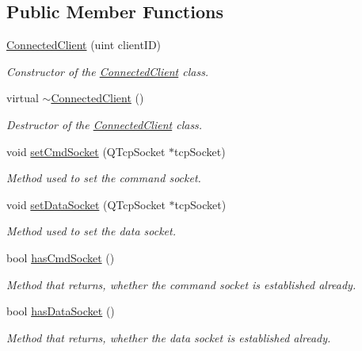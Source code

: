 \subsection*{Public Member Functions}
\begin{DoxyCompactItemize}
\item 
\hyperlink{class_network_1_1_connected_client_a9797ac03885fae449628ab2403515398}{Connected\+Client} (uint client\+I\+D)
\begin{DoxyCompactList}\small\item\em Constructor of the \hyperlink{class_network_1_1_connected_client}{Connected\+Client} class. \end{DoxyCompactList}\item 
virtual \hyperlink{class_network_1_1_connected_client_ad10880c9d465fba5f29dd9acfc8f374e}{$\sim$\+Connected\+Client} ()
\begin{DoxyCompactList}\small\item\em Destructor of the \hyperlink{class_network_1_1_connected_client}{Connected\+Client} class. \end{DoxyCompactList}\item 
void \hyperlink{class_network_1_1_connected_client_a84d4ba47b0b82bb01fa6faca9e793412}{set\+Cmd\+Socket} (Q\+Tcp\+Socket $\ast$tcp\+Socket)
\begin{DoxyCompactList}\small\item\em Method used to set the command socket. \end{DoxyCompactList}\item 
void \hyperlink{class_network_1_1_connected_client_ab992b4c8be1eca019690e728f34d8bbd}{set\+Data\+Socket} (Q\+Tcp\+Socket $\ast$tcp\+Socket)
\begin{DoxyCompactList}\small\item\em Method used to set the data socket. \end{DoxyCompactList}\item 
bool \hyperlink{class_network_1_1_connected_client_ac406ccefcf1864e3a50da9c1b05ef9bc}{has\+Cmd\+Socket} ()
\begin{DoxyCompactList}\small\item\em Method that returns, whether the command socket is established already. \end{DoxyCompactList}\item 
bool \hyperlink{class_network_1_1_connected_client_a7e702f3d7a9da70838b0baae35a3558e}{has\+Data\+Socket} ()
\begin{DoxyCompactList}\small\item\em Method that returns, whether the data socket is established already. \end{DoxyCompactList}\item 

\end{DoxyCompactItemize}
